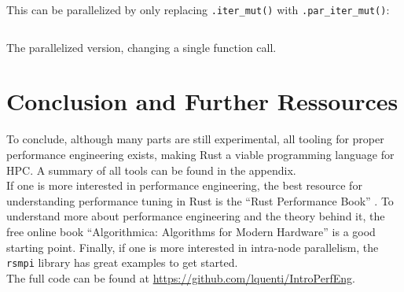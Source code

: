 This can be parallelized by only replacing \texttt{.iter\_mut()} with \texttt{.par\_iter\_mut()}:

\begin{listing}[H]
  \inputminted{rust}{./assets/03rayon.rs}
\caption{The parallelized version, changing a single function call.}
\end{listing}

\section{Conclusion and Further Ressources}

To conclude, although many parts are still experimental, all tooling for proper performance engineering exists, making Rust a viable programming language for \ac{HPC}. A summary of all tools can be found in the appendix.\\

If one is more interested in performance engineering, the best resource for understanding performance tuning in Rust is the ``Rust Performance Book'' \cite{rperfbook}. To understand more about performance engineering and the theory behind it, the free online book ``Algorithmica: Algorithms for Modern Hardware'' \cite{algomodern} is a good starting point. Finally, if one is more interested in intra-node parallelism, the \texttt{rsmpi} library \cite{rsmpi} has great examples to get started.\\

The full code can be found at \url{https://github.com/lquenti/IntroPerfEng}.
